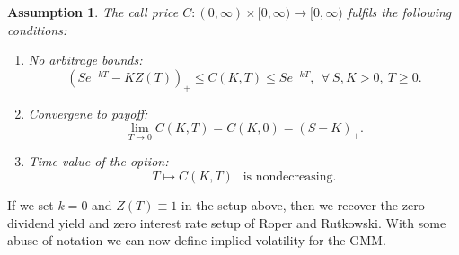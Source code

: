 \documentclass[a4 paper, 12pt]{report}
\theoremstyle{plain}
\newtheorem{assumption}[theorem]{\textbf{Assumption}}
\begin{document}
\begin{assumption}\cite[pg.~10]{guo2011small}\label{as2}
The call price $C:(0,\infty)\times [0,\infty)\rightarrow[0,\infty)$ fulfils the following conditions:
\begin{enumerate}
\item[(C1)] No arbitrage bounds:
\begin{equation}\label{neww16}
(Se^{-kT} - KZ(T))_+\leq C(K,T)\leq Se^{-kT},~~\forall~ S,K>0,~T\geq 0.
\end{equation}
\item[(C2)] Convergene to payoff:
\begin{equation}\label{neww17}
\lim_{T\rightarrow0}C(K,T) = C(K,0) = (S-K)_+.
\end{equation}
\item[(C3)] Time value of the option:
\begin{equation}\label{neww18}
T\mapsto C(K,T) ~~\mbox{  is nondecreasing}.
\end{equation}
\end{enumerate}
\end{assumption}
If we set $k=0$ and $Z(T) \equiv 1$ in the setup above, then we recover the zero dividend yield and zero interest rate setup of Roper and Rutkowski. With some abuse of notation we can now define implied volatility for the GMM.
\end{document}

